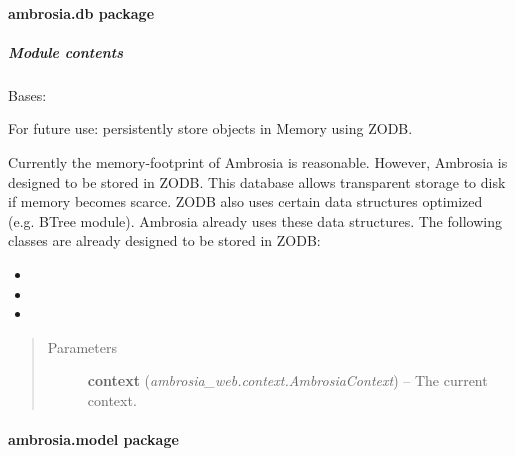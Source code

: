 \documentclass[letterpaper,10pt,english]{sphinxmanual}
\begin{document}
\paragraph{ambrosia.db package}
\label{ambrosia.db:ambrosia-db-package}\label{ambrosia.db::doc}

\subparagraph{Module contents}
\label{ambrosia.db:module-ambrosia.db}\label{ambrosia.db:module-contents}

\begin{fulllineitems}
\label{ambrosia.db:ambrosia.db.AmbrosiaDb}
Bases: 

For future use: persistently store objects in Memory using ZODB.

Currently the memory-footprint of Ambrosia is reasonable. However, Ambrosia is designed to be stored in ZODB.
This database allows transparent storage to disk if memory becomes scarce. ZODB also uses certain data structures
optimized (e.g. BTree module). Ambrosia already uses these data structures. The following classes are already
designed to be stored in ZODB:
\begin{itemize}
\item {} 

\item {} 

\item {} 

\end{itemize}
\begin{quote}\begin{description}
\item[{Parameters}] \leavevmode
\textbf{context} (\emph{ambrosia\_web.context.AmbrosiaContext}) -- The current context.

\end{description}\end{quote}

\end{fulllineitems}



\paragraph{ambrosia.model package}
\label{ambrosia.model:ambrosia-model-package}\label{ambrosia.model::doc}
\end{document}
